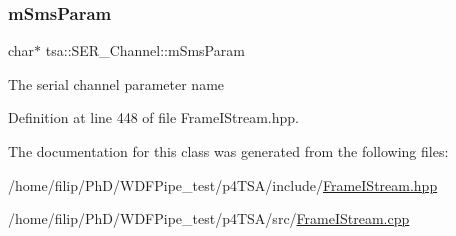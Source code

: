 \subsubsection{\texorpdfstring{m\+Sms\+Param}{mSmsParam}}
{\footnotesize\ttfamily char$\ast$ tsa\+::\+S\+E\+R\+\_\+\+Channel\+::m\+Sms\+Param\hspace{0.3cm}{\ttfamily [private]}}

The serial channel parameter name 

Definition at line 448 of file Frame\+I\+Stream.\+hpp.



The documentation for this class was generated from the following files\+:\begin{DoxyCompactItemize}
\item 
/home/filip/\+Ph\+D/\+W\+D\+F\+Pipe\+\_\+test/p4\+T\+S\+A/include/\hyperlink{_frame_i_stream_8hpp}{Frame\+I\+Stream.\+hpp}\item 
/home/filip/\+Ph\+D/\+W\+D\+F\+Pipe\+\_\+test/p4\+T\+S\+A/src/\hyperlink{_frame_i_stream_8cpp}{Frame\+I\+Stream.\+cpp}\end{DoxyCompactItemize}
